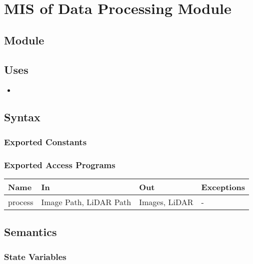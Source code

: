 \documentclass[12pt, titlepage]{article}
\begin{document}
\newpage

\section{MIS of Data Processing Module} \label{Module} 

\subsection{Module}



\subsection{Uses}
\begin{itemize}
  \item 
\end{itemize}

\subsection{Syntax}



\subsubsection{Exported Constants}



\subsubsection{Exported Access Programs}

\begin{center}
\begin{tabular}{p{2cm}|p{6cm}|p{2cm}|p{2cm}}
\hline
\textbf{Name} & \textbf{In} & \textbf{Out} & \textbf{Exceptions} \\
\hline
process & Image Path, LiDAR Path & Images, LiDAR & - \\
\hline
\end{tabular}
\end{center}

\subsection{Semantics}

\subsubsection{State Variables}
\end{document}

